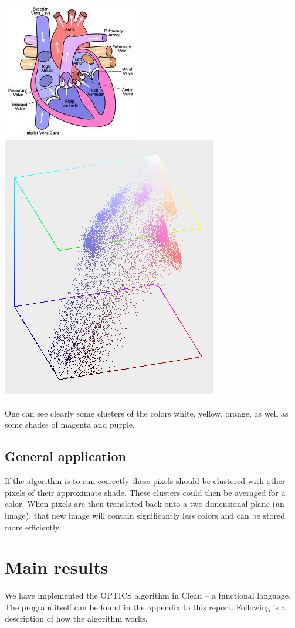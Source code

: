 \documentclass[12pt,a4paper]{article}
\begin{document}
\includegraphics[scale=0.6]{img/diagram.png}
\includegraphics[scale=0.6]{img/colorplot.png}
\\
\\
One can see clearly some clusters of the colors white, yellow, orange, as well as some shades of magenta and purple.

\subsection{General application}
If the algorithm is to run correctly these pixels should be clustered with other pixels of their approximate shade. These clusters could then be averaged for a color. When pixels are then translated back onto a two-dimensional plane (an image), that new image will contain significantly less colors and can be stored more efficiently.

\clearpage
\section{Main results}
We have implemented the OPTICS algorithm in Clean – a functional language. The program itself can be found in the appendix to this report. Following is a description of how the algorithm works.
\end{document}
